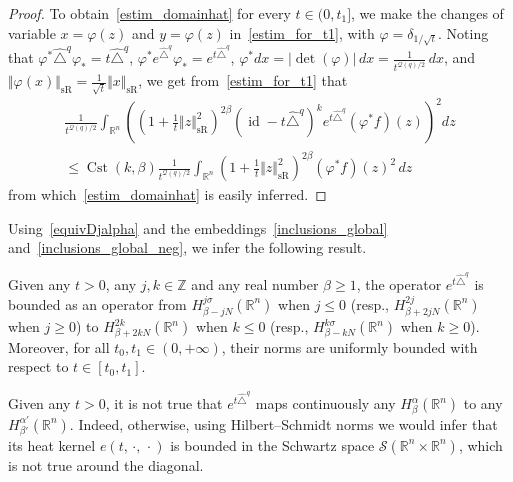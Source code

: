 \documentclass[AHL,Unicode,published]{cedram}
\newcommand*\R{\mathbb{R}}
\newcommand*\Z{\mathbb{Z}}
\newcommand{\calQ}{\mathcal{Q}}
\newcommand{\calS}{\mathcal{S}}
\DeclareMathOperator{\Cst}{Cst}
\DeclareMathOperator{\id}{id}
\DeclareMathOperator{\sR}{sR}
\renewcommand{\geq}{\geqslant}
\renewcommand{\leq}{\leqslant}
\begin{document}
\begin{proof}
To obtain~\eqref{estim_domainhat} for every $t\in(0,t_1]$, we make the changes of variable $x=\varphi(z)$ and $y=\varphi(z)$ in~\eqref{estim_for_t1}, with $\varphi=\delta_{1/\sqrt{t}}$. Noting that $\varphi^* \widehat{\triangle}^q \varphi_* = t \widehat{\triangle}^q$, $\varphi^* e^{\widehat{\triangle}^q} \varphi_* = e^{t \widehat{\triangle}^q}$, $\varphi^*dx=\vert\det(\varphi)\vert\, dx=\frac{1}{t^{\calQ(q)/2}}\, dx$, and $\Vert\varphi(x)\Vert_{\sR} = \frac{1}{\sqrt{t}} \Vert x\Vert_{\sR}$, we get from~\eqref{estim_for_t1} that
\begin{multline*}
\frac{1}{t^{\calQ(q)/2}}\int_{\R^n} \left(\left(1+ \frac{1}{t} \Vert z\Vert_{\sR}^2 \right)^{2\beta} \left(\id - t\widehat{\triangle}^q\right)^k e^{t\widehat{\triangle}^q} (\varphi^*f)(z) \right)^2 dz \\
\leq \Cst(k,\beta) \frac{1}{t^{\calQ(q)/2}} \int_{\R^n} \left(1+ \frac{1}{t} \Vert z\Vert_{\sR}^2 \right)^{2\beta} (\varphi^*f)(z)^2\, dz
\end{multline*}
from which~\eqref{estim_domainhat} is easily inferred.
\end{proof}



Using~\eqref{equivDjalpha} and the embeddings~\eqref{inclusions_global} and~\eqref{inclusions_global_neg}, we infer the following result.

\begin{coro}
Given any $t>0$, any $j,k\in\Z$ and any real number $\beta\geq 1$, the operator $e^{t\widehat{\triangle}^q}$ is bounded as an operator from $H^{j\sigma}_{\beta-jN}(\R^n)$ when $j\leq 0$ (resp., $H^{2j}_{\beta+2jN}(\R^n)$ when $j\geq 0$) to $H^{2k}_{\beta+2kN}(\R^n)$ when $k\leq 0$ (resp., $H^{k\sigma}_{\beta-kN}(\R^n)$ when $k\geq 0$). Moreover, for all $t_0,t_1\in(0,+\infty)$, their norms are uniformly bounded with respect to $t\in[t_0,t_1]$.
\end{coro}



\begin{rema}
Given any $t>0$, it is not true that $e^{t\widehat{\triangle}^q}$ maps continuously any $H^\alpha_\beta(\R^n)$ to any $H^{\alpha'}_{\beta'}(\R^n)$. Indeed, otherwise, using Hilbert--Schmidt norms we would infer that its heat kernel $e(t,\,\cdot,\,\cdot)$ is bounded in the Schwartz space $\calS(\R^n\times\R^n)$, which is not true around the diagonal.
\end{rema}


\newpage


\end{document}
